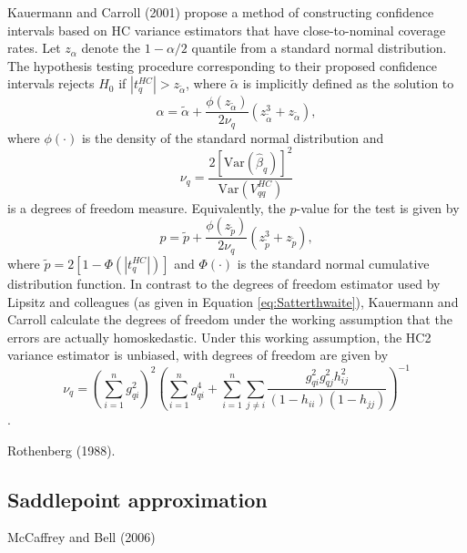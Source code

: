 \documentclass{article}\usepackage[]{graphicx}\usepackage[]{color}
\newcommand{\Var}{\text{Var}}
\begin{document}
Kauermann and Carroll (2001) propose a method of constructing confidence intervals based on HC variance estimators that have close-to-nominal coverage rates. Let $z_{\alpha}$ denote the $1 - \alpha / 2$ quantile from a standard normal distribution. The hypothesis testing procedure corresponding to their proposed confidence intervals rejects $H_0$ if $\left|t^{HC}_q\right| > z_{\tilde\alpha}$, where $\tilde\alpha$ is implicitly defined as the solution to \[
\alpha = \tilde\alpha + \frac{\phi\left(z_{\tilde\alpha}\right)}{2 \nu_q}\left(z_{\tilde\alpha}^3 + z_{\tilde\alpha}\right), \]
where $\phi(\cdot)$ is the density of the standard normal distribution and \[
\nu_q  = \frac{2 \left[\Var(\hat\beta_q)\right]^2}{\Var\left(V^{HC}_{qq}\right)}\] 
is a degrees of freedom measure. Equivalently, the $p$-value for the test is given by \[
p = \tilde{p} + \frac{\phi\left(z_{\tilde{p}}\right)}{2 \nu_q}\left(z_{\tilde{p}}^3 + z_{\tilde{p}}\right), \]
where $\tilde{p} = 2 \left[1 - \Phi\left(|t^{HC}_q|\right)\right]$ and $\Phi(\cdot)$ is the standard normal cumulative distribution function. In contrast to the degrees of freedom estimator used by Lipsitz and colleagues (as given in Equation \ref{eq:Satterthwaite}), Kauermann and Carroll calculate the degrees of freedom under the working assumption that the errors are actually homoskedastic. Under this working assumption, the HC2 variance estimator is unbiased, with degrees of freedom are given by \[
\nu_q = \left(\sum_{i=1}^n g_{qi}^2\right)^2\left(\sum_{i=1}^n g_{qi}^4 + \sum_{i=1}^n \sum_{j \neq i} \frac{g_{qi}^2 g_{qj}^2 h_{ij}^2}{(1 - h_{ii})(1 - h_{jj})}\right)^{-1} \].

Rothenberg (1988). 

\subsection{Saddlepoint approximation}

McCaffrey and Bell (2006)
\end{document}
